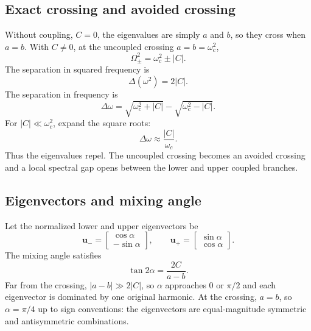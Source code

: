 \subsection{Exact crossing and avoided crossing}
Without coupling, $C=0$, the eigenvalues are simply $a$ and $b$, so they cross when $a=b$. With $C\neq0$, at the uncoupled crossing $a=b=\omega_c^2$,
\begin{equation}
\Omega_\pm^2=\omega_c^2\pm|C|.
\label{eq:gap_at_crossing_omega2}
\end{equation}
The separation in squared frequency is
\begin{equation}
\Delta(\omega^2)=2|C|.
\end{equation}
The separation in frequency is
\begin{equation}
\Delta\omega=\sqrt{\omega_c^2+|C|}-\sqrt{\omega_c^2-|C|}.
\label{eq:exact_gap_frequency}
\end{equation}
For $|C|\ll\omega_c^2$, expand the square roots:
\begin{equation}
\boxed{\Delta\omega\approx\frac{|C|}{\omega_c}.}
\label{eq:small_gap_frequency}
\end{equation}
Thus the eigenvalues repel. The uncoupled crossing becomes an avoided crossing and a local spectral gap opens between the lower and upper coupled branches.

\subsection{Eigenvectors and mixing angle}
Let the normalized lower and upper eigenvectors be
\begin{equation}
\mathbf u_-=\begin{bmatrix}\cos\alpha\\-\sin\alpha\end{bmatrix},
\qquad
\mathbf u_+=\begin{bmatrix}\sin\alpha\\\cos\alpha\end{bmatrix}.
\end{equation}
The mixing angle satisfies
\begin{equation}
\tan2\alpha=\frac{2C}{a-b}.
\label{eq:mixing_angle}
\end{equation}
Far from the crossing, $|a-b|\gg2|C|$, so $\alpha$ approaches 0 or $\pi/2$ and each eigenvector is dominated by one original harmonic. At the crossing, $a=b$, so $\alpha=\pi/4$ up to sign conventions: the eigenvectors are equal-magnitude symmetric and antisymmetric combinations.

